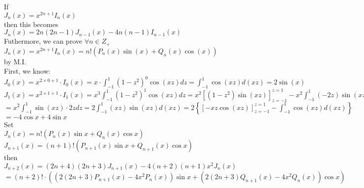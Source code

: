 \documentclass{article}
\begin{document}
If\\

$\displaystyle J_n(x) = x^{2n+1} I_n(x)$\\

then this becomes\\

$\displaystyle J_n(x) = 2n(2n-1) J_{n-1}(x) -4n(n-1)I_{n-1}(x)$\\

Futhermore, we can prove $\forall n \in Z_+$\\

$\displaystyle J_n(x) = x^{2n+1} I_n(x) = n! \left(P_n(x) \sin{(x)} + Q_n(x) \cos{(x)}\right)$\\

by M.I.\\

First, we know:\\

$\displaystyle J_0(x) = x^{2 \times 0+1} \cdot I_0(x) = x \cdot \int_{-1}^1 (1-z^2)^0 \cos{(xz)} dz = \int_{-1}^1 \cos{(xz)} d(xz) = 2 \sin(x)$\\

$\displaystyle J_1(x) = x^{2 \times 1 + 1} \cdot I_1(x) = x^3 \int_{-1}^1(1-z^2)^1 \cos{(xz)} dz = x^2 \left[(1-z^2) \sin{(xz)}\right]_{z = -1}^{z = 1} - x^2 \int_{-1}^1 (-2z) \sin{(xz)} dz$\\

\hskip 0.94cm $\displaystyle = x^2 \int_{-1}^1 \sin{(xz)} \cdot 2z dz = 2 \int_{-1}^1 (xz) \sin{(xz)}d(xz) = 2\left\{\left[-xz \cos(xz)\right]_{z = -1}^{z = 1} - \int_{-1}^1 \cos{(xz)} d(xz)\right\}$\\

\hskip 0.94cm $\displaystyle = -4 \cos{x} + 4 \sin{x}$\\

Set\\ 

$\displaystyle J_n(x) = n! (P_n(x) \sin{x} + Q_n(x) \cos{x})$ \quad $\displaystyle J_{n+1}(x) = (n+1)! (P_{n+1}(x) \sin{x} + Q_{n+1}(x) \cos{x})$\\

then\\

$\displaystyle J_{n+2}(x) = (2n+4) (2n+3) J_{n+1}(x) - 4(n+2)(n+1)x^2J_{n}(x)$\\

\hskip 1.32cm $\displaystyle = (n+2)! \cdot \left((2(2n+3) P_{n+1}(x) - 4x^2P_n(x)) \sin{x} + (2(2n+3) Q_{n+1}(x) - 4x^2 Q_n(x)) \cos{x}\right)$\\
\end{document}
